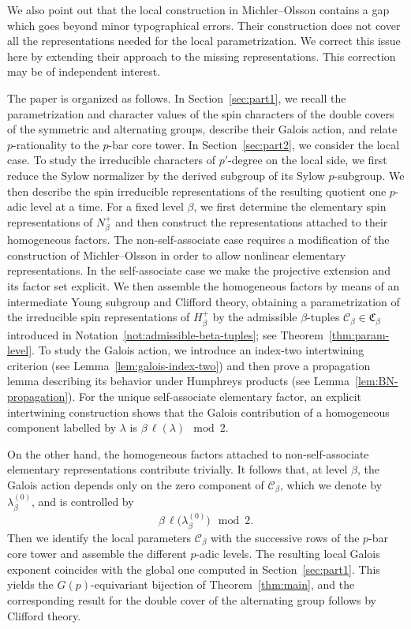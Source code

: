 \documentclass[reqno]{amsart}
\theoremstyle{definition}
\begin{document}
We also point out that the local construction in Michler--Olsson contains
a gap which goes beyond minor typographical errors. Their construction
does not cover all the representations needed for the local
parametrization.
We correct this issue here by extending their approach to the missing
representations. This correction may be of independent interest.

\medskip

The paper is organized as follows. In Section~\ref{sec:part1}, we recall
the parametrization and character values of the spin characters of the
double covers of the symmetric and alternating groups, describe their
Galois action, and relate $p$-rationality to the $p$-bar core tower.
In Section~\ref{sec:part2}, we consider the local case.
To study the irreducible characters of $p'$-degree on the local side, we
first reduce the Sylow normalizer by the derived subgroup of its Sylow
$p$-subgroup. We then describe the spin irreducible representations of
the resulting quotient one $p$-adic level at a time. For a fixed
level $\beta$, we first determine the elementary spin representations of
$N_\beta^+$ and then construct the representations attached to their
homogeneous factors. The non-self-associate case requires a modification
of the construction of Michler--Olsson in order to allow nonlinear
elementary representations. In the self-associate case we make the
projective extension and its factor set explicit. 
We then assemble the homogeneous factors by means of an intermediate
Young subgroup and Clifford theory, obtaining a parametrization of the
irreducible spin representations of $H_\beta^+$ by the admissible
$\beta$-tuples $\mathcal C_\beta\in\mathfrak C_\beta$ introduced in
Notation~\ref{not:admissible-beta-tuples}; see
Theorem~\ref{thm:param-level}.
To study the Galois action, we introduce an index-two intertwining
criterion (see Lemma~\ref{lem:galois-index-two}) and then prove a
propagation lemma describing its behavior under Humphreys products (see
Lemma~\ref{lem:BN-propagation}).
For the unique self-associate elementary factor, an explicit intertwining
construction shows that the Galois contribution of a homogeneous component
labelled by $\lambda$ is $ \beta\,\ell(\lambda)\mod2 $.

On the other hand, the homogeneous factors attached to non-self-associate
elementary representations contribute trivially. It follows that, at level
$\beta$, the Galois action depends only on the zero component of
$\mathcal C_\beta$, which we denote by $\lambda_\beta^{(0)}$, and is
controlled by
\[
\beta\,\ell\bigl(\lambda_\beta^{(0)}\bigr)\mod2.
\]
Then we identify the local parameters $\mathcal C_\beta$ with the
successive rows of the $p$-bar core tower and assemble the different
$p$-adic levels. The resulting local Galois exponent coincides with the
global one computed in Section~\ref{sec:part1}. This yields the
$G(p)$-equivariant bijection of Theorem~\ref{thm:main}, and the
corresponding result for the double cover of the alternating group follows
by Clifford theory.
\end{document}
